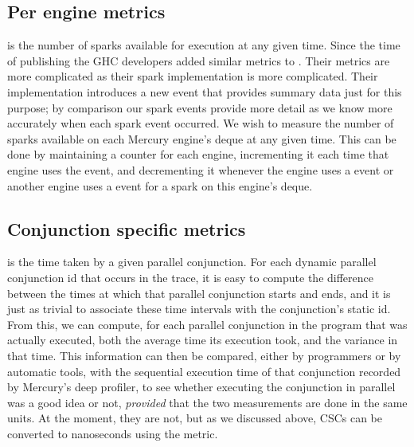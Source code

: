 

\subsection{Per engine metrics}

is the number of sparks available for execution at any given time.
Since the time of publishing \citet{bone:2011:tscope} the GHC developers
added similar metrics to \tscope.
Their metrics are more complicated as their spark implementation is more
complicated.
Their implementation introduces a new event that provides summary data just
for this purpose;
by comparison our spark events provide more detail as we know more accurately
when each spark event occurred.
We wish to measure the number of sparks available on each Mercury engine's
deque at any given time.
This can be done by maintaining a counter for each engine,
incrementing it each time that engine uses the  event,
and decrementing it whenever the engine uses a  event or
another engine uses a  event for a spark on this
engine's deque.


\subsection{Conjunction specific metrics}

 is the time taken by a given parallel conjunction.
For each dynamic parallel conjunction id that occurs in the trace,
it is easy to compute the difference between
the times at which that parallel conjunction starts and ends,
and it is just as trivial to associate these time intervals
with the conjunction's static id.
From this, we can compute,
for each parallel conjunction in the program that was actually executed,
both the average time its execution took,
and the variance in that time.
This information can then be compared,
either by programmers or by automatic tools,
with the sequential execution time of that conjunction recorded by
Mercury's deep profiler,
to see whether executing the conjunction in parallel was a good idea or not,
\emph{provided} that the two measurements are done in the same units.
At the moment, they are not, but as we discussed above,
CSCs can be converted to nanoseconds using the 
metric.


